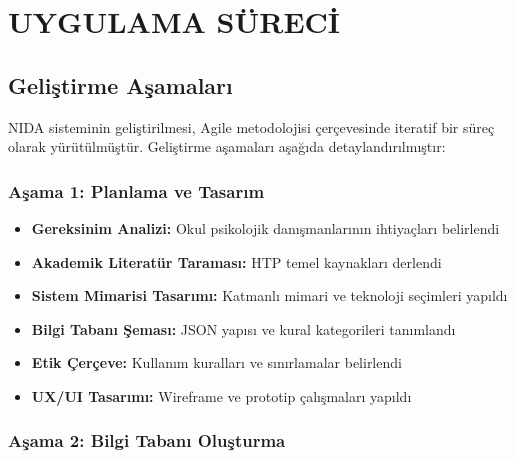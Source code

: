 
\chapter{UYGULAMA SÜRECİ}

\section{Geliştirme Aşamaları}

NIDA sisteminin geliştirilmesi, Agile metodolojisi çerçevesinde iteratif bir süreç olarak yürütülmüştür. Geliştirme aşamaları aşağıda detaylandırılmıştır:

\subsection{Aşama 1: Planlama ve Tasarım}

\begin{itemize}
  \item \textbf{Gereksinim Analizi:} Okul psikolojik danışmanlarının ihtiyaçları belirlendi
  \item \textbf{Akademik Literatür Taraması:} HTP temel kaynakları derlendi
  \item \textbf{Sistem Mimarisi Tasarımı:} Katmanlı mimari ve teknoloji seçimleri yapıldı
  \item \textbf{Bilgi Tabanı Şeması:} JSON yapısı ve kural kategorileri tanımlandı
  \item \textbf{Etik Çerçeve:} Kullanım kuralları ve sınırlamalar belirlendi
  \item \textbf{UX/UI Tasarımı:} Wireframe ve prototip çalışmaları yapıldı
\end{itemize}

\subsection{Aşama 2: Bilgi Tabanı Oluşturma}

